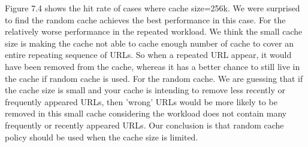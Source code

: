 \documentclass[paper=a4, fontsize=11pt]{scrartcl} %
\numberwithin{equation}{section} %
\numberwithin{figure}{section} %
\numberwithin{table}{section} %
\begin{document}
Figure 7.4 shows the hit rate of cases where cache size=256k. We were surprised to find the random cache achieves the best performance in this case. For the relatively worse performance in the repeated workload. We think the small cache size is making the cache not able to cache enough number of cache to cover an entire repeating sequence of URLs. So when a repeated URL appear, it would have been removed from the cache, whereas it has a better chance to still live in the cache if random cache is used. For the random cache. We are guessing that if the cache size is small and your cache is intending to remove less recently or frequently appeared URLs, then 'wrong' URLs would be more likely to be removed in this small cache considering the workload does not contain many frequently or recently appeared URLs. Our conclusion is that random cache policy should be used when the cache size is limited.    
\end{document}
